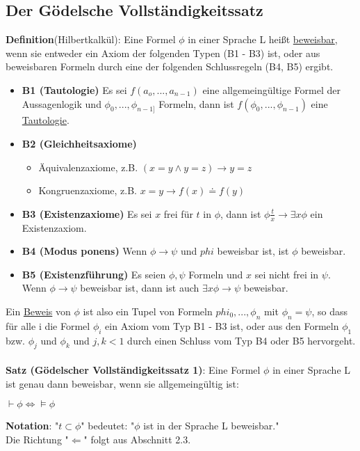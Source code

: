 \documentclass[a4paper]{scrartcl}
\begin{document}
\subsection{Der Gödelsche Vollständigkeitssatz}
\textbf{Definition}(Hilbertkalkül): Eine Formel $\phi$ in einer Sprache L heißt \underline{beweisbar}, wenn sie entweder ein Axiom der folgenden Typen (B1 - B3) ist, oder aus beweisbaren Formeln durch eine der folgenden Schlussregeln (B4, B5) ergibt.
\begin{itemize}
\item \textbf{B1 (Tautologie)} Es sei $f(a_o, ..., a_{n-1})$ eine allgemeingültige Formel der Aussagenlogik und $\phi_0,...,\phi_{n-1]}$ Formeln, dann ist $f(\phi_0, ...,  \phi_{n-1})$ eine \underline{Tautologie}.
\item \textbf{B2 (Gleichheitsaxiome)}
\begin{itemize} \item Äquivalenzaxiome, z.B. $(x = y \wedge y = z) \rightarrow y = z$
\item Kongruenzaxiome, z.B. $x = y \rightarrow f(x)\doteq f(y)$
\end{itemize}
\item \textbf{B3 (Existenzaxiome)} Es sei $x$ frei für $t$ in $\phi$, dann ist $\phi \frac{t}{x} \rightarrow \exists x \phi$ ein Existenzaxiom.
\item \textbf{B4 (Modus ponens)} Wenn $\phi \rightarrow \psi$ und $phi$ beweisbar ist, ist $\phi$ beweisbar.
\item \textbf{B5 (Existenzführung)} Es seien $\phi, \psi$ Formeln und $x$ sei nicht frei in $\psi$. Wenn $\phi \rightarrow \psi$ beweisbar ist, dann ist auch $\exists x \phi \rightarrow \psi$ beweisbar.
\end{itemize}
Ein \underline{Beweis} von $\phi$ ist also ein Tupel von Formeln $phi_0, ..., \phi_n$ mit $\phi_n = \psi$, so dass für alle i die Formel $\phi_i$ ein Axiom vom Typ B1 - B3 ist, oder aus den Formeln $\phi_1$ bzw. $\phi_j$ und $\phi_k$ und $j, k < 1$ durch einen Schluss vom Typ B4 oder B5 hervorgeht.\\\\
\textbf{Satz (Gödelscher Vollständigkeitssatz 1)}: Eine Formel $\phi$ in einer Sprache L ist genau dann beweisbar, wenn sie allgemeingültig ist:\\
\begin{center}
$\vdash \phi \Leftrightarrow \models \phi$
\end{center}
\newpage
\textbf{Notation}: "$t \subset \phi$" bedeutet: "$\phi$ ist in der Sprache L beweisbar." \\ Die Richtung "$\Leftarrow$" folgt aus Abschnitt 2.3.\\
\end{document}
